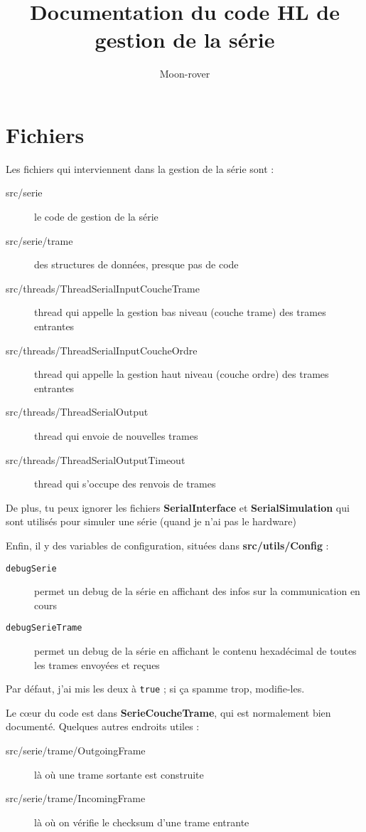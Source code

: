 \documentclass[a4paper, 12pt]{article}
\title{Documentation du code HL de gestion de la série}
\author{Moon-rover}
\date{}
\begin{document}
\maketitle

\pagestyle{plain}

\section{Fichiers}

Les fichiers qui interviennent dans la gestion de la série sont :
\begin{description}
\item[src/serie]
le code de gestion de la série
\item[src/serie/trame]
des structures de données, presque pas de code
\item[src/threads/ThreadSerialInputCoucheTrame]
thread qui appelle la gestion bas niveau (couche trame) des trames entrantes
\item[src/threads/ThreadSerialInputCoucheOrdre]
thread qui appelle la gestion haut niveau (couche ordre) des trames entrantes
\item[src/threads/ThreadSerialOutput]
thread qui envoie de nouvelles trames
\item[src/threads/ThreadSerialOutputTimeout]
thread qui s'occupe des renvois de trames
\end{description}

De plus, tu peux ignorer les fichiers \textbf{SerialInterface} et \textbf{SerialSimulation} qui sont utilisés pour simuler une série (quand je n'ai pas le hardware)

Enfin, il y des variables de configuration, situées dans \textbf{src/utils/Config} :
\begin{description}
\item[\texttt{debugSerie}] permet un debug de la série en affichant des infos sur la communication en cours
\item[\texttt{debugSerieTrame}] permet un debug de la série en affichant le contenu hexadécimal de toutes les trames envoyées et reçues
\end{description}

Par défaut, j'ai mis les deux à \texttt{true} ; si ça spamme trop, modifie-les.

Le cœur du code est dans \textbf{SerieCoucheTrame}, qui est normalement bien documenté. Quelques autres endroits utiles :

\begin{description}
\item[src/serie/trame/OutgoingFrame] là où une trame sortante est construite
\item[src/serie/trame/IncomingFrame] là où on vérifie le checksum d'une trame entrante
\end{description}
\end{document}
